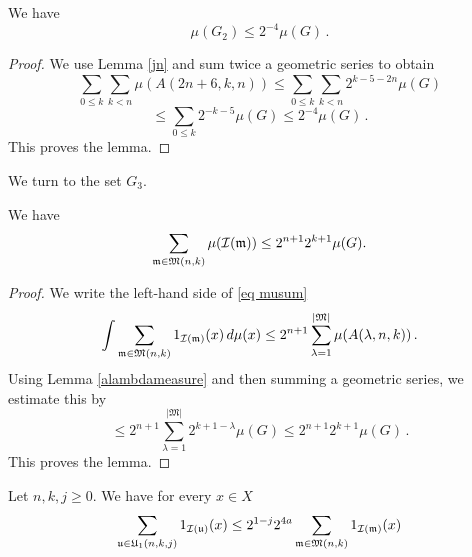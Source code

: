 \begin{lemma}\label{g2bound}
We have
\begin{equation}
    \mu(G_2)\le 2^{-4} \mu(G)\, .
\end{equation}
\end{lemma}
\begin{proof}

We use Lemma \ref{jn} and sum twice a geometric series
to obtain
\begin{equation}
    \sum_{0\le  k}\sum_{k< n}
\mu(A(2n+6,k,n))\le \sum_{0\le  k}\sum_{k< n} 2^{k-5-2n}\mu(G)
\end{equation}
\begin{equation}
   \le \sum_{0\le  k} 2^{-k-5}\mu(G)\le 2^{-4}\mu(G)\, .
\end{equation}
This proves the lemma.
\end{proof}


We turn to the set $G_3$.

\begin{lemma}\label{musumlemma}
    We have
    \begin{equation}\label{eq musum}
        \sum_{\mathfrak{m} \in \mathfrak{M}(n,k)} \mu(\sc(\mathfrak{m}))\le 2^{n+1}2^{k+1}\mu(G).
    \end{equation}
\end{lemma}
\begin{proof}
    We write the left-hand side of \ref{eq musum}
\begin{equation}
    \int \sum_{\mathfrak{m} \in \mathfrak{M}(n,k)} 1_{\sc(\mathfrak{m})}(x) \, d\mu(x) \le
2^{n+1} \sum_{\lambda=1}^{|\mathfrak{M}|}\mu(A(\lambda, n,k))\,.
\end{equation}
Using Lemma \ref{alambdameasure} and then summing a geometric series, we estimate this by
\begin{equation}
    \le
2^{n+1}\sum_{\lambda=1}^{|\mathfrak{M}|}
2^{k+1-\lambda}\mu(G)
\le
2^{n+1}2^{k+1}\mu(G)\, .
\end{equation}
This proves the lemma.
\end{proof}


\begin{lemma}\label{countu}
Let $n,k,j\ge 0$. We have for every $x\in X$
\begin{equation}
    \sum_{\fu\in \fU_1(n,k,j)} 1_{\sc(\fu)}(x)
    \le 2^{1-j}
    2^{4a} \sum_{\mathfrak{m}\in \mathfrak{M}(n,k)}
     1_{\sc(\mathfrak{m})}(x)
\end{equation}
\end{lemma}


